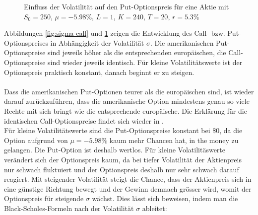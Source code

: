 \documentclass[11pt]{report} %
\begin{document}
\begin{figure}[H]
    \centering
    \caption{Einfluss der Volatilität auf den Put-Optionspreis für eine Aktie mit $S_0=250$, $\mu=-5.98\%$, $L=1$, $K=240$, $T=20$, $r=5.3\%$}
    \label{fig:sigma-put}
\end{figure}
Abbildungen \ref{fig:sigma-call} und \ref{fig:sigma-put} zeigen die Entwicklung des Call- bzw. Put-Optionspreises in Abhängigkeit der Volatilität $\sigma$. Die amerikanischen Put-Optionspreise sind jeweils höher als die entsprechenden europäischen, die Call-Optionspreise sind wieder jeweils identisch. Für kleine Volatilitätswerte ist der Optionspreis praktisch konstant, danach beginnt er zu steigen.\\\\Dass die amerikanischen Put-Optionen teurer als die europäischen sind, ist wieder darauf zurückzuführen, dass die amerikanische Option mindestens genau so viele Rechte mit sich bringt wie die entsprechende europäische. Die Erklärung für die identischen Call-Optionspreise findet sich wieder in \textcite{Adelmeyer2003}.\\Für kleine Volatilitätswerte sind die Put-Optionspreise konstant bei \$0, da die Option aufgrund von $\mu=-5.98\%$ kaum mehr Chancen hat, in the money zu gelangen. Die Put-Option ist deshalb wertlos. Für kleine Volatilitäswerte verändert sich der Optionspreis kaum, da bei tiefer Volatilität der Aktienpreis nur schwach fluktuiert und der Optionspreis deshalb nur sehr schwach darauf reagiert. Mit steigender Volatilität steigt die Chance, dass der Aktienpreis sich in eine günstige Richtung bewegt und der Gewinn demnach grösser wird, womit der Optionspreis für steigende $\sigma$ wächst. Dies lässt sich beweisen, indem man die Black-Scholes-Formeln nach der Volatilität $\sigma$ ableitet:
\end{document}
